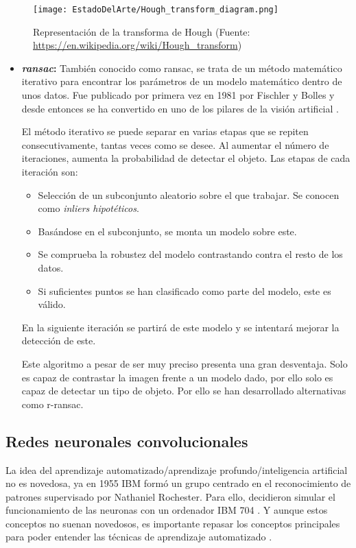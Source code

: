 \begin{figure}[ht]
	\centering
	\texttt{[image: EstadoDelArte/Hough\_transform\_diagram.png]}
	\caption[Representación de la transforma de Hough]{Representación de la transforma de Hough (Fuente: \url{https://en.wikipedia.org/wiki/Hough_transform})}
	\label{chap:Estado de la cuestion fig:Hough}
	\vspace{-5pt}
\end{figure}

\begin{itemize}
\item \textbf{\textit{\acl{ransac}}:} También conocido como \acs{ransac}, se trata de un método matemático iterativo para encontrar los parámetros de un modelo matemático dentro de unos datos. Fue publicado por primera vez en 1981 por Fischler y Bolles y desde entonces se ha convertido en uno de los pilares de la visión artificial \cite{Fischler1981RandomSC}.

El método iterativo se puede separar en varias etapas que se repiten consecutivamente, tantas veces como se desee. Al aumentar el número de iteraciones, aumenta la probabilidad de detectar el objeto. Las etapas de cada iteración son:

\begin{itemize}
\item Selección de un subconjunto aleatorio sobre el que trabajar. Se conocen como \textit{inliers hipotéticos}.
\item  Basándose en el subconjunto, se monta un modelo sobre este.
\item Se comprueba la robustez del modelo contrastando contra el resto de los datos.
\item Si suficientes puntos se han clasificado como parte del modelo, este es válido.
\end{itemize}

En la siguiente iteración se partirá de este modelo y se intentará mejorar la detección de este.

Este algoritmo a pesar de ser muy preciso presenta una gran desventaja. Solo es capaz de contrastar la imagen frente a un modelo dado, por ello solo es capaz de detectar un tipo de objeto. Por ello se han desarrollado alternativas como \ac{r-ransac}.
\end{itemize}

\subsection{Redes neuronales convolucionales}
\label{chap:Estado de la cuestion sec:Procesado de la imagen subsec:Redes neuronales convolucionales}
La idea del aprendizaje automatizado/aprendizaje profundo/inteligencia artificial  no es novedosa, ya en 1955 IBM formó un grupo centrado en el reconocimiento de patrones supervisado por Nathaniel Rochester. Para ello, decidieron simular el funcionamiento de las neuronas con un ordenador IBM 704 \cite{Rochester}. Y aunque estos conceptos no suenan novedosos, es importante repasar los conceptos principales para poder entender las técnicas de aprendizaje automatizado \citep{alom2018history}.

